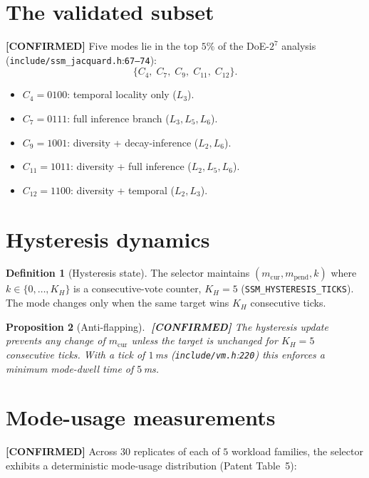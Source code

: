 \documentclass[11pt,letterpaper,openany]{book}
\theoremstyle{definition}
\newtheorem{definition}{Definition}[chapter]
\theoremstyle{plain}
\newtheorem{proposition}[definition]{Proposition}
\newcommand{\confirmed}{\textcolor{green!50!black}{\textbf{[CONFIRMED]}}\xspace}
\newcommand{\Loop}[1]{L_{#1}}
\newcommand{\sourceref}[2]{\texttt{#1}:\texttt{#2}}
\begin{document}
\section{The validated subset}

\confirmed Five modes lie in the top $5\%$ of the DoE-$2^7$ analysis
(\sourceref{include/ssm\_jacquard.h}{67--74}):
\[
  \{C_4,\;C_7,\;C_9,\;C_{11},\;C_{12}\}.
\]
\begin{itemize}\setlength\itemsep{0pt}
  \item $C_4 = 0100$: temporal locality only ($\Loop{3}$).
  \item $C_7 = 0111$: full inference branch ($\Loop{3},\Loop{5},\Loop{6}$).
  \item $C_9 = 1001$: diversity + decay-inference ($\Loop{2},\Loop{6}$).
  \item $C_{11} = 1011$: diversity + full inference ($\Loop{2},\Loop{5},\Loop{6}$).
  \item $C_{12} = 1100$: diversity + temporal ($\Loop{2},\Loop{3}$).
\end{itemize}

\section{Hysteresis dynamics}

\begin{definition}[Hysteresis state]
The selector maintains $(m_{\mathrm{cur}}, m_{\mathrm{pend}}, k)$ where
$k \in \{0,\dots,K_H\}$ is a consecutive-vote counter, $K_H = 5$
(\texttt{SSM\_HYSTERESIS\_TICKS}). The mode changes only when the same
target wins $K_H$ consecutive ticks.
\end{definition}

\begin{proposition}[Anti-flapping]\label{prop:anti-flap}
$\;$\confirmed
The hysteresis update prevents any change of $m_{\mathrm{cur}}$ unless
the target is unchanged for $K_H = 5$ consecutive ticks. With a tick of
$1$\,ms (\sourceref{include/vm.h}{220}) this enforces a minimum mode-dwell
time of $5$\,ms.
\end{proposition}

\section{Mode-usage measurements}

\confirmed Across $30$ replicates of each of $5$ workload families, the
selector exhibits a deterministic mode-usage distribution (Patent Table~5):
\end{document}
